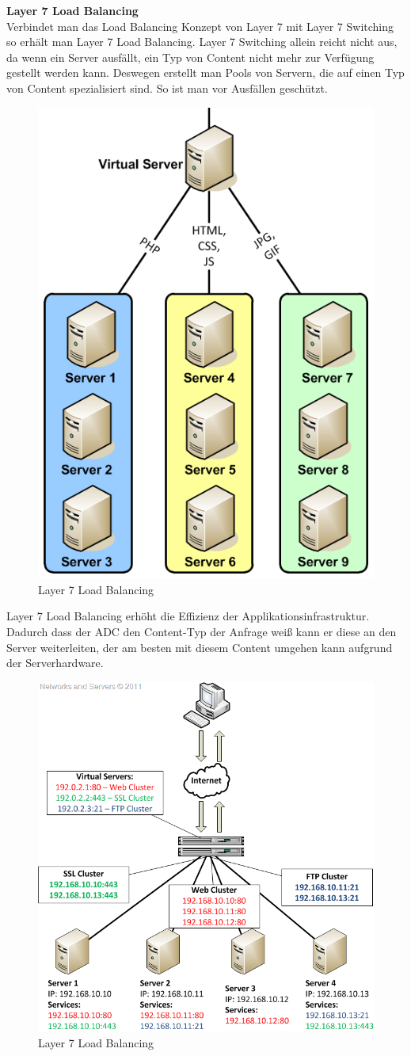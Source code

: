 \textbf{Layer 7 Load Balancing} \\
Verbindet man das Load Balancing Konzept von Layer 7 mit Layer 7 Switching so erhält man Layer 7 Load Balancing. Layer 7 Switching allein reicht nicht aus, da wenn ein Server ausfällt, ein Typ von Content nicht mehr zur Verfügung gestellt werden kann. Deswegen erstellt man Pools von Servern, die auf einen Typ von Content spezialisiert sind. So ist man vor Ausfällen geschützt. 
\pagebreak
\begin{figure}[!h]
	\begin{center}
		\includegraphics[width=0.3\linewidth]{images/loadbalancing6.jpg}
		\caption{Layer 7 Load Balancing \cite{LoadBalancing2}}
		\label{Layer 7 Load Balancing}
	\end{center}
\end{figure}

Layer 7 Load Balancing erhöht die Effizienz der Applikationsinfrastruktur. Dadurch dass der ADC den Content-Typ der Anfrage weiß kann er diese an den Server weiterleiten, der am besten mit diesem Content umgehen kann aufgrund der Serverhardware. \cite{LoadBalancing3}

\begin{figure}[!h]
	\begin{center}
		\includegraphics[width=0.55\linewidth]{images/loadbalancing7.jpg}
		\caption{Layer 7 Load Balancing \cite{LoadBalancing2}}
		\label{Layer 7 Load Balancing_2}
	\end{center}
\end{figure}

